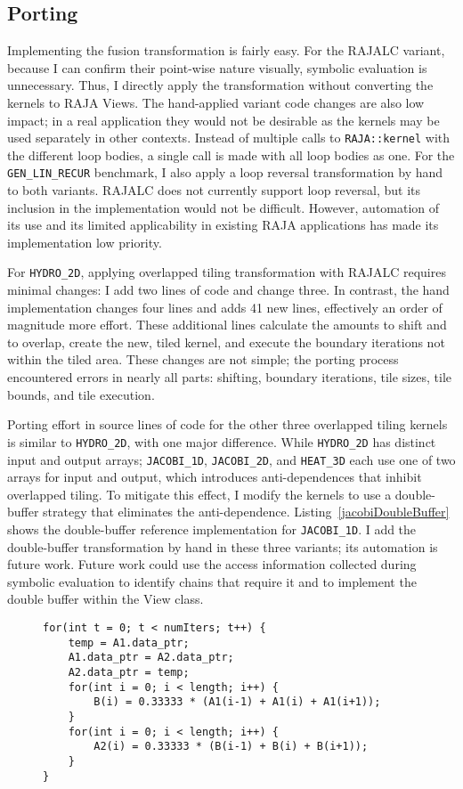 \subsection{Porting}

Implementing the fusion transformation is fairly easy. 
For the RAJALC variant, because I can confirm their point-wise nature
visually, symbolic evaluation is unnecessary.
Thus, I directly apply the transformation without converting the kernels to 
RAJA Views.
The hand-applied variant code changes are also low impact; in a real
application they would not be desirable as the kernels may be used separately
in other contexts.
Instead of multiple calls to \verb.RAJA::kernel. with the different loop
bodies, a single call is made with all loop bodies as one.
For the \verb.GEN_LIN_RECUR. benchmark, I also apply a loop reversal
transformation by hand to both variants. RAJALC does not currently support 
loop reversal, but its inclusion in the implementation would not be difficult.
However, automation of its use and its limited applicability in 
existing RAJA applications has made its implementation low priority. 

For \verb.HYDRO_2D., applying overlapped tiling transformation with RAJALC 
requires minimal changes: I add two lines of code and change three. 
In contrast, the hand implementation changes four lines and adds 41
new lines, effectively an order of magnitude more effort. 
These additional lines calculate the amounts to shift and to overlap, 
create the new, tiled kernel, and execute the boundary iterations not
within the tiled area. 
These changes are not simple; the porting process encountered errors
in nearly all parts: shifting, boundary iterations, tile sizes, tile
bounds, and tile execution.

Porting effort in source lines of code
for the other three overlapped tiling kernels is similar to 
\verb.HYDRO_2D., with one major difference.  
While \verb.HYDRO_2D. has distinct input and output arrays; \verb.JACOBI_1D., 
\verb.JACOBI_2D., and \verb.HEAT_3D. each use one of two arrays for
input and output, which introduces anti-dependences that inhibit 
overlapped tiling. 
To mitigate this effect, I modify the kernels to use
a double-buffer strategy that eliminates the anti-dependence. 
Listing~\ref{jacobiDoubleBuffer} shows the double-buffer reference
implementation for \verb.JACOBI_1D..
I add the double-buffer transformation by hand in these three variants;
its automation is future work.
Future work could use the access information collected during symbolic evaluation
to identify chains that require it and to implement the double buffer within
the View class.
\begin{figure}[t]
\begin{lstlisting}[label={jacobiDoubleBuffer},caption={Double-Buffer Implementation for JACOBI\_1D}]
for(int t = 0; t < numIters; t++) {
	temp = A1.data_ptr;
	A1.data_ptr = A2.data_ptr;
	A2.data_ptr = temp;
	for(int i = 0; i < length; i++) {
		B(i) = 0.33333 * (A1(i-1) + A1(i) + A1(i+1));
	}
	for(int i = 0; i < length; i++) {
		A2(i) = 0.33333 * (B(i-1) + B(i) + B(i+1));
	}
}
\end{lstlisting}
\end{figure}

